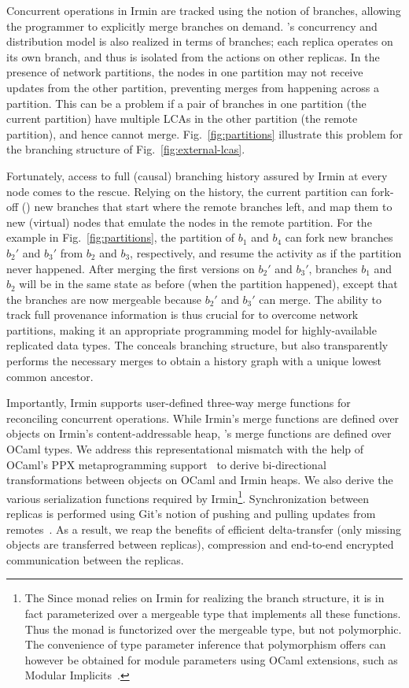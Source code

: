 Concurrent operations in Irmin are tracked using the notion of
branches, allowing the programmer to explicitly merge branches on
demand. \name's concurrency and distribution model is also realized in
terms of branches; each replica operates on its own branch, and thus
is isolated from the actions on other replicas. In the presence of
network partitions, the nodes in one partition may not receive updates
from the other partition, preventing merges from happening across a
partition. This can be a problem if a pair of branches in one
partition (the current partition) have multiple LCAs in the other
partition (the remote partition), and hence cannot
merge. Fig.~\ref{fig:partitions} illustrate this problem for the
branching structure of Fig.~\ref{fig:external-lcas}.

Fortunately, access to full (causal) branching history assured by
Irmin at every node comes to the rescue. Relying on the history, the
current partition can fork-off () new branches that start
where the remote branches left, and map them to new (virtual) nodes
that emulate the nodes in the remote partition. For the example in
Fig.~\ref{fig:partitions}, the partition of $b_1$ and $b_4$ can fork
new branches $b_2'$ and $b_3'$ from $b_2$ and $b_3$, respectively, and
resume the activity as if the partition never happened. After merging
the first versions on $b_2'$ and $b_3'$, branches $b_1$ and $b_2$ will
be in the same state as before (when the partition happened), except
that the branches are now mergeable because $b_2'$ and $b_3'$ can
merge. The ability to track full provenance information is thus
crucial for \name to overcome network partitions, making it an
appropriate programming model for highly-available replicated data
types. The \nameMonad conceals branching structure, but also
transparently performs the necessary merges to obtain a history graph
with a unique lowest common ancestor.

Importantly, Irmin supports user-defined three-way merge functions for
reconciling concurrent operations. While Irmin's merge functions are
defined over objects on Irmin's content-addressable heap, \name's
merge functions are defined over OCaml types. We address this
representational mismatch with the help of OCaml's PPX metaprogramming
support~\cite{ppx} to derive bi-directional transformations between
objects on OCaml and Irmin heaps. We also derive the various
serialization functions required by Irmin\footnote{
  The Since \nameMonad monad relies on Irmin for realizing the branch
  structure, it is in fact parameterized over a mergeable type that
  implements all these functions. Thus the monad is functorized over
  the mergeable type, but not polymorphic. The convenience of type
  parameter inference that polymorphism offers can however be obtained
  for module parameters using OCaml extensions, such as Modular
  Implicits~\cite{implicits}.
}.
Synchronization between replicas is performed using Git's notion of
pushing and pulling updates from remotes~\cite{git-tp}. As a result, we reap the
benefits of efficient delta-transfer (only missing objects are transferred between
replicas), compression and end-to-end encrypted communication between
the replicas.
